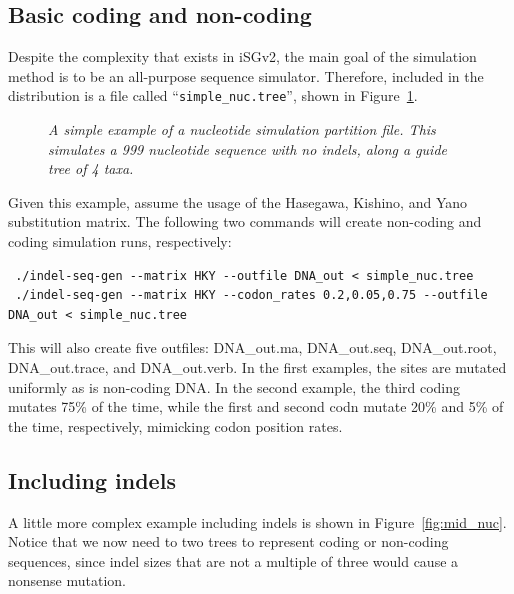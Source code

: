 \documentclass[10pt]{article}
\begin{document}
 \subsection{Basic coding and non-coding}
 Despite the complexity that exists in iSGv2, the main goal of the simulation method is to be an all-purpose sequence simulator. Therefore, included in the distribution is a file called ``{\tt simple\_nuc.tree}'', shown in Figure~\ref{fig:simple_nuc}. 
 
 \begin{figure}
 \caption{\textit{A simple example of a nucleotide simulation partition file. This simulates a 999 nucleotide sequence with no indels, along a guide tree of 4 taxa.}}
 \label{fig:simple_nuc}
 \end{figure}
 	
 Given this example, assume the usage of the Hasegawa, Kishino, and Yano~\cite{Hasegawa85} substitution matrix. The following two commands will create non-coding and coding simulation runs, respectively:
 \begin{verbatim}
 ./indel-seq-gen --matrix HKY --outfile DNA_out < simple_nuc.tree
 ./indel-seq-gen --matrix HKY --codon_rates 0.2,0.05,0.75 --outfile DNA_out < simple_nuc.tree
 \end{verbatim}

 This will also create five outfiles: DNA\_out.ma, DNA\_out.seq, DNA\_out.root, DNA\_out.trace, and DNA\_out.verb. In the first examples, the sites are mutated uniformly as is non-coding DNA. In the second example, the third coding mutates 75\% of the time, while the first and second codn mutate 20\% and 5\% of the time, respectively, mimicking codon position rates.

 \subsection{Including indels}

 A little more complex example including indels is shown in Figure~\ref{fig:mid_nuc}. Notice that we now need to two trees to represent coding or non-coding sequences, since indel sizes that are not a multiple of three would cause a nonsense mutation.
 
\end{document}
